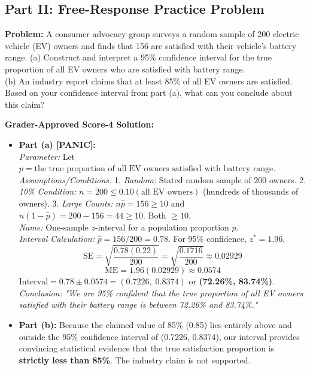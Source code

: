 \subsection*{Part II: Free-Response Practice Problem}

\begin{workbookbox}
\textbf{Problem:} A consumer advocacy group surveys a random sample of 200 electric vehicle (EV) owners and finds that 156 are satisfied with their vehicle's battery range.
(a) Construct and interpret a 95\% confidence interval for the true proportion of all EV owners who are satisfied with battery range.\\
(b) An industry report claims that at least 85\% of all EV owners are satisfied. Based on your confidence interval from part (a), what can you conclude about this claim?

\textbf{Grader-Approved Score-4 Solution:}
\begin{itemize}[leftmargin=1.2em]
  \item \textbf{Part (a) [PANIC]:}\\
  \textit{Parameter:} Let $p = \text{the true proportion of all EV owners satisfied with battery range}$.\\
  \textit{Assumptions/Conditions:}
  1. \textit{Random:} Stated random sample of 200 owners.
  2. \textit{10\% Condition:} $n = 200 \le 0.10(\text{all EV owners})$ (hundreds of thousands of owners).
  3. \textit{Large Counts:} $n\hat{p} = 156 \ge 10$ and $n(1-\hat{p}) = 200 - 156 = 44 \ge 10$. Both $\ge 10$.\\
  \textit{Name:} One-sample $z$-interval for a population proportion $p$.\\
  \textit{Interval Calculation:} $\hat{p} = 156/200 = 0.78$. For 95\% confidence, $z^* = 1.96$.
  \[ \text{SE} = \sqrt{\frac{0.78(0.22)}{200}} = \sqrt{\frac{0.1716}{200}} \approx 0.02929 \]
  \[ \text{ME} = 1.96(0.02929) \approx 0.0574 \]
  $\text{Interval} = 0.78 \pm 0.0574 = \mathbf{(0.7226, \; 0.8374)}$ or \textbf{(72.26\%, 83.74\%)}.\\
  \textit{Conclusion:} \textit{"We are 95\% confident that the true proportion of all EV owners satisfied with their battery range is between 72.26\% and 83.74\%."}
  \item \textbf{Part (b):} Because the claimed value of 85\% (0.85) lies entirely above and outside the 95\% confidence interval of (0.7226, 0.8374), our interval provides convincing statistical evidence that the true satisfaction proportion is \textbf{strictly less than 85\%}. The industry claim is not supported.
\end{itemize}
\end{workbookbox}



